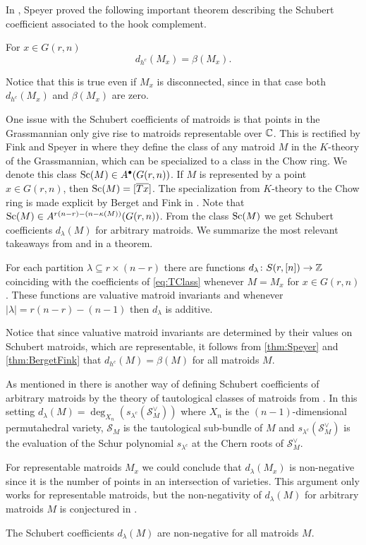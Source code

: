 In \cite{Speyer}, Speyer proved the following important theorem describing the Schubert coefficient associated to the hook complement.
\begin{thm}\textnormal{\cite[Theorem 5.1]{Speyer}}
    \label{thm:Speyer}
    For $x \in G(r,n)$
    \begin{equation*}
        d_{h^c}(M_x) = \beta(M_x).
    \end{equation*}
\end{thm}
Notice that this is true even if $M_x$ is disconnected, since in that case both $d_{h^c}(M_x)$ and $\beta(M_x)$ are zero.

One issue with the Schubert coefficients of matroids is that points in the Grassmannian only give rise to matroids representable over ${\mathbb C}$. This is rectified by Fink and Speyer in \cite{FinkSpeyer} where they define the class of any matroid \(M\) in the \(K\)-theory of the Grassmannian, which can be specialized to a class in the Chow ring. We denote this class \(\operatorname{\mathrm{Sc}}(M) \in A^\bullet(G(r,n))\). If \(M\) is represented by a point \(x \in G(r,n)\), then \(\operatorname{\mathrm{Sc}}(M) = [{\overline{Tx}}]\). The specialization from \(K\)-theory to the Chow ring is made explicit by Berget and Fink in \cite{BergetFink}. Note that $\operatorname{\mathrm{Sc}}(M) \in A^{r(n-r)-(n-\kappa(M))}(G(r,n))$. From the class $\operatorname{\mathrm{Sc}}(M)$ we get Schubert coefficients $d_\lambda(M)$ for arbitrary matroids. We summarize the most relevant takeaways from \cite{FinkSpeyer} and \cite{BergetFink} in a theorem.
\begin{thm}
\label{thm:BergetFink}
    For each partition $\lambda \subseteq r\times (n-r)$ there are functions $d_\lambda \colon S(r,[n]) \to {\mathbb Z}$ coinciding with the coefficients of \cref{eq:TClass} whenever $M = M_x$ for $x\in G(r,n)$. These functions are valuative matroid invariants and whenever $|\lambda| = r(n-r)-(n-1)$ then $d_\lambda$ is additive.
\end{thm}
Notice that since valuative matroid invariants are determined by their values on Schubert matroids, which are representable, it follows from \cref{thm:Speyer} and \cref{thm:BergetFink} that \(d_{h^c}(M) = \beta(M)\) for all matroids \(M\).

As mentioned in \cite{BergetFink} there is another way of defining Schubert coefficients of arbitrary matroids by the theory of tautological classes of matroids from \cite{BEST}. In this setting $d_\lambda(M) = \deg_{X_n}(s_{\lambda^c}(\mathcal{S}_M^\vee))$ where $X_n$ is the $(n-1)$-dimensional permutahedral variety, $\mathcal{S}_M$ is the tautological sub-bundle of $M$ and $s_{\lambda^c}(\mathcal{S}_M^\vee)$ is the evaluation of the Schur polynomial $s_{\lambda^c}$ at the Chern roots of $\mathcal{S}_M^\vee$.

For representable matroids $M_x$ we could conclude that $d_\lambda(M_x)$ is non-negative since it is the number of points in an intersection of varieties. This argument only works for representable matroids, but the non-negativity of $d_\lambda(M)$ for arbitrary matroids $M$ is conjectured in \cite{BergetFink}.
\begin{conj}\textnormal{\cite[Conjecture 9.13]{BergetFink}}
    \label{conj:positivity}
    The Schubert coefficients $d_\lambda(M)$ are non-negative for all matroids $M$.
\end{conj}

